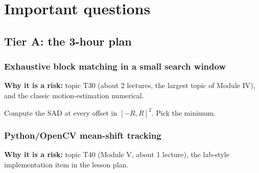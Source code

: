 \chapter{Important questions}
\label{ch:iq}
\section{Tier A: the 3-hour plan}
\subsection*{Exhaustive block matching in a small search window}\label{iq:C098}
\par
\textbf{Why it is a risk:} topic T30 (about 2 lectures, the largest topic of Module IV), and the classic motion-estimation numerical.

\begin{answerplan}[5 marks]
 Compute the SAD at every offset in $[-R,R]^2$. \quad {} Pick the minimum.
\end{answerplan}

\subsection*{Python/OpenCV mean-shift tracking}\label{iq:C122}
\par
\textbf{Why it is a risk:} topic T40 (Module V, about 1 lecture), the lab-style implementation item in the lesson plan.


